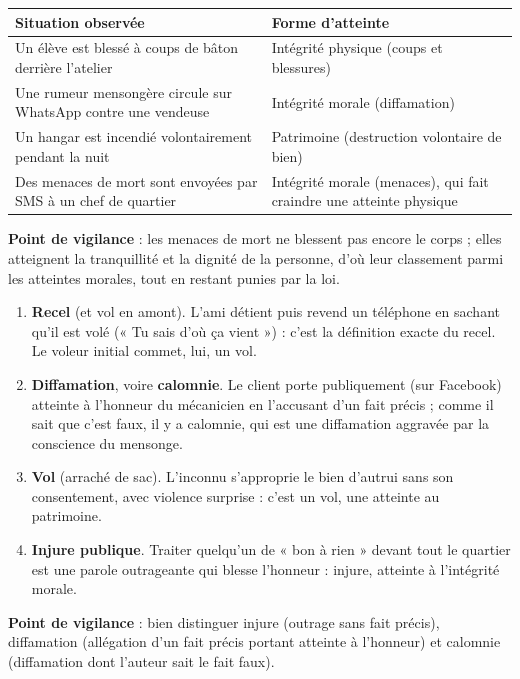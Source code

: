 \documentclass[11pt]{article}
\newcommand{\cle}[1]{{\popxbold\color{popdark}#1}}
\begin{document}
\begin{corrige}
\begin{center}
\begin{tabularx}{\linewidth}{|X|l|}
\hline
\rowcolor{popblueL} \textbf{Situation observée} & \textbf{Forme d'atteinte} \\
\hline
Un élève est blessé à coups de bâton derrière l'atelier & Intégrité \cle{physique} (coups et blessures) \\
\hline
Une rumeur mensongère circule sur WhatsApp contre une vendeuse & Intégrité \cle{morale} (diffamation) \\
\hline
Un hangar est incendié volontairement pendant la nuit & \cle{Patrimoine} (destruction volontaire de bien) \\
\hline
Des menaces de mort sont envoyées par SMS à un chef de quartier & Intégrité \cle{morale} (menaces), qui fait craindre une atteinte physique \\
\hline
\end{tabularx}
\end{center}
\textbf{Point de vigilance} : les menaces de mort ne blessent pas encore le corps ; elles atteignent la tranquillité et la dignité de la personne, d'où leur classement parmi les atteintes morales, tout en restant punies par la loi.
\end{corrige}

\begin{corrige}
\begin{enumerate}
\item \textbf{Recel} (et vol en amont). L'ami détient puis revend un téléphone en sachant qu'il est volé (« Tu sais d'où ça vient ») : c'est la définition exacte du recel. Le voleur initial commet, lui, un vol.
\item \textbf{Diffamation}, voire \textbf{calomnie}. Le client porte publiquement (sur Facebook) atteinte à l'honneur du mécanicien en l'accusant d'un fait précis ; comme il sait que c'est faux, il y a calomnie, qui est une diffamation aggravée par la conscience du mensonge.
\item \textbf{Vol} (arraché de sac). L'inconnu s'approprie le bien d'autrui sans son consentement, avec violence surprise : c'est un vol, une atteinte au patrimoine.
\item \textbf{Injure publique}. Traiter quelqu'un de « bon à rien » devant tout le quartier est une parole outrageante qui blesse l'honneur : injure, atteinte à l'intégrité morale.
\end{enumerate}
\textbf{Point de vigilance} : bien distinguer injure (outrage sans fait précis), diffamation (allégation d'un fait précis portant atteinte à l'honneur) et calomnie (diffamation dont l'auteur sait le fait faux).
\end{corrige}
\end{document}
